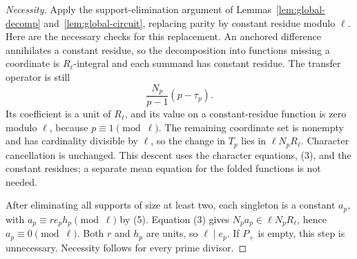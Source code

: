 \documentclass[11pt]{amsart}
\theoremstyle{definition}
\theoremstyle{remark}
\numberwithin{equation}{section}
\begin{document}
\begin{proof}[Necessity]
Apply the support-elimination argument of
Lemmas~\ref{lem:global-decomp} and~\ref{lem:global-circuit}, replacing
parity by constant residue modulo $\ell$. Here are the necessary
checks for this replacement. An anchored difference annihilates a
constant residue, so the decomposition into functions missing a
coordinate is $R_\ell$-integral and each summand has constant residue.
The transfer operator is still
\[
 \frac{N_p}{p-1}(p-\tau_p).
\]
Its coefficient is a unit of $R_\ell$, and its value on a
constant-residue function is zero modulo $\ell$, because
$p\equiv1\pmod\ell$. The remaining coordinate set is nonempty and
has cardinality divisible by $\ell$, so the change in $T_p$ lies in
$\ell N_pR_\ell$. Character cancellation is unchanged.
This descent uses the character equations, (3), and the constant
residues; a separate mean equation for the folded functions is not
needed.

After eliminating all supports of size at least two, each singleton
is a constant $a_p$, with
$a_p\equiv re_ph_p\pmod\ell$ by (5). Equation (3) gives
$N_pa_p\in\ell N_pR_\ell$, hence $a_p\equiv0\pmod\ell$.
Both $r$ and $h_p$ are units, so $\ell\mid e_p$. If $P_+$ is empty,
this step is unnecessary. Necessity follows for every prime divisor.
\end{proof}
\end{document}
